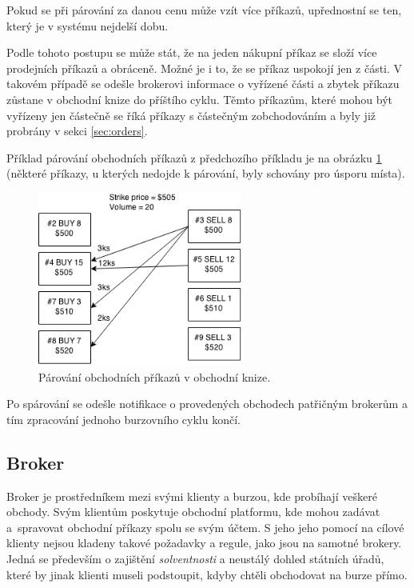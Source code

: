 \documentclass[thesis=M,czech]{FITthesis}[2012/06/26]
\begin{document}
	Pokud se při párování za danou cenu může vzít více příkazů, upřednostní se ten, který je v systému nejdelší dobu.
	
	Podle tohoto postupu se může stát, že na jeden nákupní příkaz se složí více prodejních příkazů a obráceně. Možné je i to, že se příkaz uspokojí jen z části. V takovém případě se odešle brokerovi informace o vyřízené části a zbytek příkazu zůstane v obchodní knize do příštího cyklu. Těmto příkazům, které mohou být vyřízeny jen částečně se říká příkazy s částečným zobchodováním a byly již probrány v sekci \ref{sec:orders}.

	Příklad párování obchodních příkazů z předchozího příkladu je na obrázku \ref{fig:order_matching} (některé příkazy, u kterých nedojde k párování, byly schovány pro úsporu místa).
	
\begin{figure}[h]
	\centering
	\includegraphics[width=0.6\textwidth]{images/order_matching}
 	\caption[Párování obchodních příkazů v obchodní knize]{Párování obchodních příkazů v obchodní knize.}
 	\label{fig:order_matching} 	
\end{figure}


	Po spárování se odešle notifikace o provedených obchodech patřičným brokerům a tím zpracování jednoho burzovního cyklu končí.

\subsection{Broker}

	Broker je prostředníkem mezi svými klienty a burzou, kde probíhají veškeré obchody. Svým klientům poskytuje obchodní platformu, kde mohou zadávat a~spravovat obchodní příkazy spolu se svým účtem. S jeho jeho pomocí na cílové klienty nejsou kladeny takové požadavky a regule, jako jsou na samotné brokery. Jedná se především o zajištění \textit{solventnosti} a neustálý dohled státních úřadů, které by jinak klienti museli podstoupit, kdyby chtěli obchodovat na burze přímo.
\end{document}
